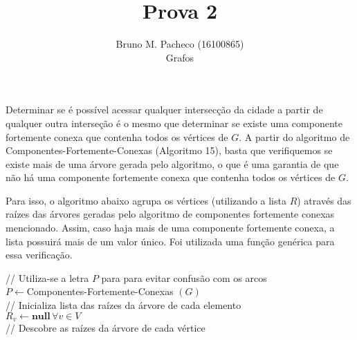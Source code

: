 \documentclass[a4paper]{report}
\begin{document}
 
\title{Prova 2}
\author{Bruno M. Pacheco (16100865)\\
Grafos}
 
\maketitle
 

Determinar se é possível acessar qualquer intersecção da cidade a partir de qualquer outra interseção é o mesmo que determinar se existe uma componente fortemente conexa que contenha todos os vértices de $G$. A partir do algoritmo de Componentes-Fortemente-Conexas (Algoritmo 15), basta que verifiquemos se existe mais de uma árvore gerada pelo algoritmo, o que é uma garantia de que não há uma componente fortemente conexa que contenha todos os vértices de $G$.

Para isso, o algoritmo abaixo agrupa os vértices (utilizando a lista $R$) através das raízes das árvores geradas pelo algoritmo de componentes fortemente conexas mencionado. Assim, caso haja mais de uma componente fortemente conexa, a lista possuirá mais de um valor único. Foi utilizada uma função genérica para essa verificação.

\begin{algorithm}
    // Utiliza-se a letra $P$ para para evitar confusão com os arcos \\
    $P\gets $Componentes-Fortemente-Conexas $\left( G \right) $ \\
    // Inicializa lista das raízes da árvore de cada elemento \\
    $R_v \gets \textbf{null} \, \forall v\in V$ \\

    // Descobre as raízes da árvore de cada vértice \\
\end{algorithm}
\end{document}
